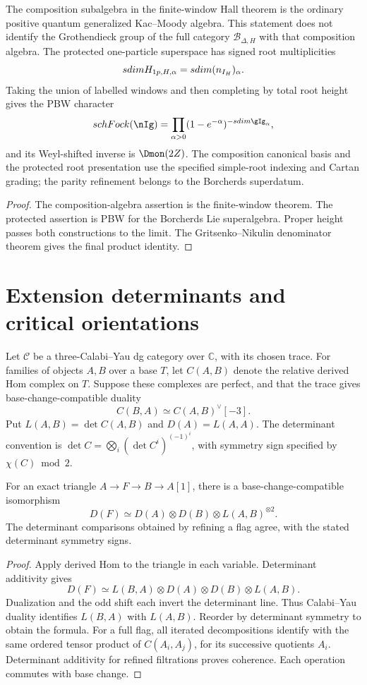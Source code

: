 \begin{theorem}
The composition subalgebra in the finite-window Hall theorem
is the ordinary positive quantum generalized Kac--Moody algebra.
This statement does not identify the Grothendieck group of the full
category $\mathcal B_{\Delta,H}$ with that composition algebra.  The protected one-particle superspace has signed root multiplicities
\[
 sdimH_{1p,H,\alpha}
 =sdim(n_{I_H})_\alpha.
\]
Taking the union of labelled windows and then completing by total
root height gives the PBW character
\[
 \sch\Fock(\nIg)
 =\prod_{\alpha>0}(1-e^{-\alpha})^{-\sdim\gIg_\alpha},
\]
and its Weyl-shifted inverse is $\Dmon(2Z)$.  The composition canonical basis and the protected root presentation use the specified simple-root indexing and Cartan grading; the parity refinement belongs to the Borcherds superdatum.
\end{theorem}
\begin{proof}
The composition-algebra assertion is the finite-window theorem. The protected assertion is PBW for the Borcherds Lie superalgebra.  Proper height passes both constructions to the limit.  The Gritsenko--Nikulin denominator theorem gives the final product identity.
\end{proof}

\section{Extension determinants and critical orientations}
Let \(\mathcal C\) be a three-Calabi--Yau dg category over
\(\mathbb C\), with its chosen trace. For families of objects
\(A,B\) over a base \(T\), let \(C(A,B)\) denote the relative
derived Hom complex on \(T\). Suppose these complexes are perfect,
and that the trace gives base-change-compatible duality
\[
 C(B,A)\simeq C(A,B)^\vee[-3].
\]
Put \(L(A,B)=\det C(A,B)\) and \(D(A)=L(A,A)\).
The determinant convention is
\(\det C=\bigotimes_i(\det C^i)^{(-1)^i}\), with symmetry sign
specified by \(\chi(C)\bmod2\).

\begin{theorem}
For an exact triangle \(A\to F\to B\to A[1]\), there is a
base-change-compatible isomorphism
\[
 D(F)\simeq D(A)\otimes D(B)\otimes L(A,B)^{\otimes2}.
\]
The determinant comparisons obtained by refining a flag agree, with
the stated determinant symmetry signs.
\end{theorem}
\begin{proof}
Apply derived Hom to the triangle in each variable. Determinant
additivity gives
\[
 D(F)\simeq L(B,A)\otimes D(A)\otimes D(B)\otimes L(A,B).
\]
Dualization and the odd shift each invert the determinant line.
Thus Calabi--Yau duality identifies \(L(B,A)\) with \(L(A,B)\).
Reorder by determinant symmetry to obtain the formula. For a full
flag, all iterated decompositions identify with the same ordered
tensor product of \(C(A_i,A_j)\), for its successive quotients
\(A_i\). Determinant additivity for refined filtrations proves
coherence. Each operation commutes with base change.
\end{proof}

